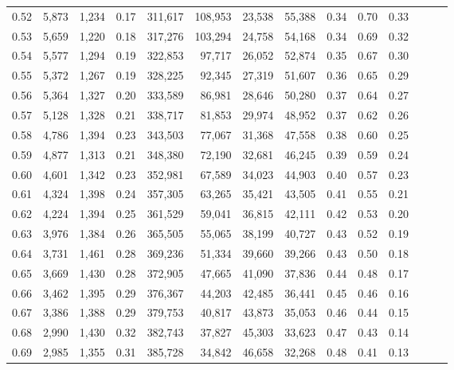 \begin{tabular}{rrrrrrrrrrrrrr}
0.52 &   5,873 &  1,234 &  0.17 &  311,617 &  108,953 &  23,538 &  55,388 &  0.34 &  0.70 &      0.33 \\
0.53 &   5,659 &  1,220 &  0.18 &  317,276 &  103,294 &  24,758 &  54,168 &  0.34 &  0.69 &      0.32 \\
0.54 &   5,577 &  1,294 &  0.19 &  322,853 &   97,717 &  26,052 &  52,874 &  0.35 &  0.67 &      0.30 \\
0.55 &   5,372 &  1,267 &  0.19 &  328,225 &   92,345 &  27,319 &  51,607 &  0.36 &  0.65 &      0.29 \\
0.56 &   5,364 &  1,327 &  0.20 &  333,589 &   86,981 &  28,646 &  50,280 &  0.37 &  0.64 &      0.27 \\
0.57 &   5,128 &  1,328 &  0.21 &  338,717 &   81,853 &  29,974 &  48,952 &  0.37 &  0.62 &      0.26 \\
0.58 &   4,786 &  1,394 &  0.23 &  343,503 &   77,067 &  31,368 &  47,558 &  0.38 &  0.60 &      0.25 \\
0.59 &   4,877 &  1,313 &  0.21 &  348,380 &   72,190 &  32,681 &  46,245 &  0.39 &  0.59 &      0.24 \\
0.60 &   4,601 &  1,342 &  0.23 &  352,981 &   67,589 &  34,023 &  44,903 &  0.40 &  0.57 &      0.23 \\
0.61 &   4,324 &  1,398 &  0.24 &  357,305 &   63,265 &  35,421 &  43,505 &  0.41 &  0.55 &      0.21 \\
0.62 &   4,224 &  1,394 &  0.25 &  361,529 &   59,041 &  36,815 &  42,111 &  0.42 &  0.53 &      0.20 \\
0.63 &   3,976 &  1,384 &  0.26 &  365,505 &   55,065 &  38,199 &  40,727 &  0.43 &  0.52 &      0.19 \\
0.64 &   3,731 &  1,461 &  0.28 &  369,236 &   51,334 &  39,660 &  39,266 &  0.43 &  0.50 &      0.18 \\
0.65 &   3,669 &  1,430 &  0.28 &  372,905 &   47,665 &  41,090 &  37,836 &  0.44 &  0.48 &      0.17 \\
0.66 &   3,462 &  1,395 &  0.29 &  376,367 &   44,203 &  42,485 &  36,441 &  0.45 &  0.46 &      0.16 \\
0.67 &   3,386 &  1,388 &  0.29 &  379,753 &   40,817 &  43,873 &  35,053 &  0.46 &  0.44 &      0.15 \\
0.68 &   2,990 &  1,430 &  0.32 &  382,743 &   37,827 &  45,303 &  33,623 &  0.47 &  0.43 &      0.14 \\
0.69 &   2,985 &  1,355 &  0.31 &  385,728 &   34,842 &  46,658 &  32,268 &  0.48 &  0.41 &      0.13 \\

\end{tabular}
